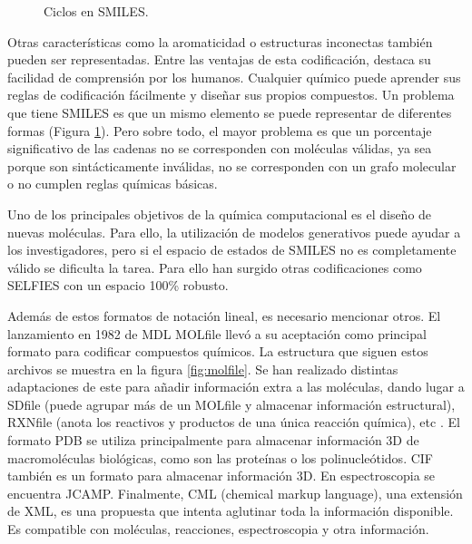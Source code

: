 \begin{figure}[H]
\centering
    \caption{Ciclos en SMILES. \cite{weininger1988smiles}} 
    \label{fig:ciclos-smiles}
\end{figure}

Otras características como la aromaticidad o estructuras inconectas también pueden ser representadas. Entre las ventajas de esta codificación, destaca su facilidad de comprensión por los humanos. Cualquier químico puede aprender sus reglas de codificación fácilmente y diseñar sus propios compuestos. Un problema que tiene SMILES es que un mismo elemento se puede representar de diferentes formas (Figura \ref{fig:ciclos-smiles}). Pero sobre todo, el mayor problema es que un porcentaje significativo de las cadenas no se corresponden con moléculas válidas, ya sea porque son sintácticamente inválidas, no se corresponden con un grafo molecular o no cumplen reglas químicas básicas. \cite{weininger1988smiles}

Uno de los principales objetivos de la química computacional es el diseño de nuevas moléculas. Para ello, la utilización de modelos generativos puede ayudar a los investigadores, pero si el espacio de estados de SMILES no es completamente válido se dificulta la tarea. Para ello han surgido otras codificaciones como SELFIES con un espacio 100\% robusto. \cite{Krenn_2020}

Además de estos formatos de notación lineal, es necesario mencionar otros. El lanzamiento en 1982 de MDL MOLfile llevó a su aceptación como principal formato para codificar compuestos químicos. La estructura que siguen estos archivos se muestra en la figura \ref{fig:molfile}. Se han realizado distintas adaptaciones de este para añadir información extra a las moléculas, dando lugar a SDfile (puede agrupar más de un MOLfile y almacenar información estructural), RXNfile (anota los reactivos y productos de una única reacción química), etc \cite{doi:10.1021/ci00007a012}. El formato PDB se utiliza principalmente para almacenar información 3D de macromoléculas biológicas, como son las proteínas o los polinucleótidos. CIF también es un formato para almacenar información 3D. En espectroscopia se encuentra JCAMP. Finalmente, CML (chemical markup language), una extensión de XML, es una propuesta que intenta aglutinar toda la información disponible. Es compatible con moléculas, reacciones, espectroscopia y otra información. \cite{doi:10.1021/ci600234z}

